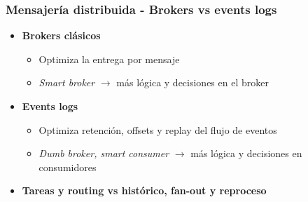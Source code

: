 \documentclass[aspectratio=169]{beamer}
\begin{document}
\begin{frame}
\frametitle{Mensajería distribuida - Brokers vs events logs}
\begin{itemize}
  \item \textbf{Brokers clásicos}
  \begin{itemize}
    \item Optimiza la entrega por mensaje
    \item \textit{Smart broker} $\rightarrow$ más lógica y decisiones en el broker
  \end{itemize}

  \vspace{1em}

  \item \textbf{Events logs}
  \begin{itemize}
    \item Optimiza retención, offsets y replay del flujo de eventos
    \item \textit{Dumb broker, smart consumer} $\rightarrow$ más lógica y decisiones en consumidores
  \end{itemize}

  \vspace{1em}

  \item \textbf{Tareas y routing vs histórico, fan-out y reproceso}
\end{itemize}
\end{frame}
\end{document}

